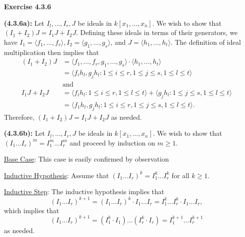 \documentclass[12pt,oneside]{article}
\newenvironment{exercise}[1]{\vspace{.1in}\noindent\textbf{Exercise #1 \hspace{.05em}}}{}
\begin{document}
\newpage
\begin{exercise}{4.3.6}
    
    \bigskip
    \textbf{(4.3.6a):}
    Let $I_l,\ldots, I_r, J$ be ideals in $k[x_1,\ldots,x_n]$. We wish to show that 
    $(I_1+I_2)J = I_1J+I_2J$. Defining these ideals in terms of their generators, we have 
    $I_1 = \langle f_1,\ldots, f_r \rangle, I_2 = \langle g_1,\ldots, g_s \rangle$, and 
    $J = \langle h_1, \ldots, h_t \rangle$. The definition of ideal multiplication then 
    implies that 
    \begin{align*}
        (I_1+I_2)J  &= \langle f_1,\ldots,f_r,g_1,\ldots,g_s\rangle \cdot \langle h_1,\ldots,h_t \rangle\\
                    &= \langle f_ih_l,g_jh_l : 1\leq i \leq r, 1 \leq j \leq s, 1 \leq l \leq t \rangle\\
                    &\text{and}\\
        I_1J+I_2J   &= \langle f_ih_l : 1 \leq i \leq r, 1 \leq l \leq t \rangle + \langle g_jh_l : 1 \leq j \leq s, 1 \leq l \leq t \rangle\\
                    &= \langle f_1h_l,g_jh_l: 1 \leq i \leq r, 1 \leq j \leq s, 1 \leq l \leq t \rangle.
    \end{align*}
    Therefore, $(I_1+I_2)J = I_1J + I_2J$ as needed.
    
    \bigskip
    \textbf{(4.3.6b):}
    Let $I_l,\ldots, I_r, J$ be ideals in $k[x_1,\ldots,x_n]$. We wish to show that 
    $(I_1\ldots I_r)^m = I_1^m\ldots I_r^m$ and proceed by induction on $m \geq 1$. 
    
    \underline{Base Case}: This case is easily confirmed by observation
    
    \underline{Inductive Hypothesis}: Assume that $(I_1\ldots I_r)^k = I_1^k\ldots I_r^k$ 
    for all $k\geq 1$. 
    
    \underline{Inductive Step}: The inductive hypothesis implies that 
    \[
        (I_1\ldots I_r)^{k+1} = (I_1\ldots I_r)^k \cdot I_1\ldots I_r = I_1^k\ldots I_r^k\cdot I_1 \ldots I_r,
    \]
    which implies that 
    \[
        (I_1\ldots I_r)^{k+1} = (I_1^k \cdot I_1) \ldots (I_r^k \cdot I_r) = I_1^{k+1} \ldots I_r^{k+1}
    \]
    as needed.
\end{exercise}

\end{document}
